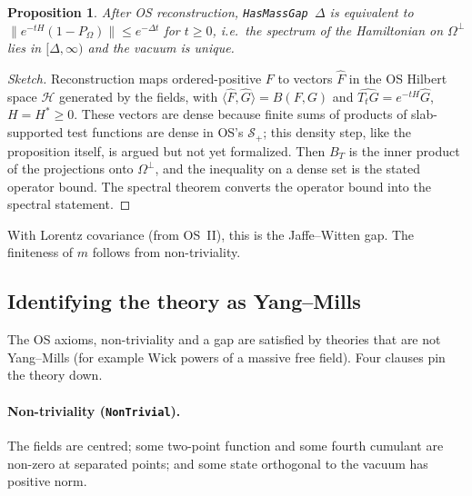 \documentclass[11pt]{article}
\newtheorem{proposition}{Proposition}[section]
\theoremstyle{definition}
\theoremstyle{remark}
\newcommand{\Sch}{\mathcal{S}}
\newcommand{\lean}[1]{\texttt{\hyphenchar\font=-1\relax #1}}
\begin{document}
\begin{proposition}
After OS reconstruction, \lean{HasMassGap}~$\Delta$ is equivalent to
$\|e^{-tH}(1-P_\Omega)\|\le e^{-\Delta t}$ for $t\ge0$, i.e.\ the spectrum of the Hamiltonian
on $\Omega^\perp$ lies in $[\Delta,\infty)$ and the vacuum is unique.
\end{proposition}
\begin{proof}[Sketch]
Reconstruction maps ordered-positive $F$ to vectors $\hat F$ in the OS Hilbert space $\mathcal H$
generated by the fields, with $\langle\hat F,\hat G\rangle=B(F,G)$ and $\widehat{T_tG}=e^{-tH}\hat G$,
$H=H^*\ge0$. These vectors are dense because finite sums of products of slab-supported test
functions are dense in OS's $\Sch_+$; this density step, like the proposition itself, is argued but
not yet formalized. Then $B_T$ is the inner
product of the projections onto $\Omega^\perp$, and the inequality on a dense set is the stated
operator bound. The spectral theorem converts the operator bound into the spectral statement.
\end{proof}
\noindent With Lorentz covariance (from OS~II), this is the Jaffe--Witten gap. The finiteness of
$m$ follows from non-triviality.

\subsection{Identifying the theory as Yang--Mills}
The OS axioms, non-triviality and a gap are satisfied by theories that are not Yang--Mills (for
example Wick powers of a massive free field). Four clauses pin the theory down.

\paragraph{Non-triviality (\lean{NonTrivial}).}
The fields are centred; some two-point function and some fourth cumulant are non-zero at
separated points; and some state orthogonal to the vacuum has positive norm.
\end{document}
